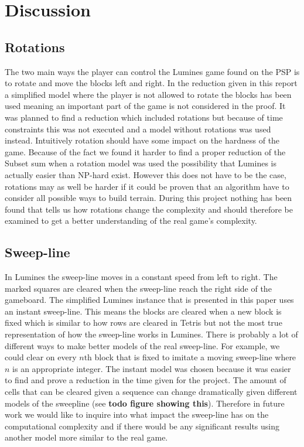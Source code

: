 \section{Discussion}
\label{discussion}

\subsection{Rotations}

The two main ways the player can control the Lumines game found on the PSP is to rotate and move the blocks left and right. In the reduction given in this report a simplified model where the player is not allowed to rotate the blocks has been used meaning an important part of the game is not considered in the proof. It was planned to find a reduction which included rotations but because of time constraints this was not executed and a model without rotations was used instead. Intuitively rotation should have some impact on the hardness of the game. Because of the fact we found it harder to find a proper reduction of the Subset sum when a rotation model was used the possibility that Lumines is actually easier than NP-hard exist. However this does not have to be the case, rotations may as well be harder if it could be proven that an algorithm have to consider all possible ways to build terrain. During this project nothing has been found that tells us how rotations change the complexity and should therefore be examined to get a better understanding of the real game's complexity.

\subsection{Sweep-line}

In Lumines the sweep-line moves in a constant speed from left to right. The marked squares are cleared when the sweep-line reach the right side of the gameboard. The simplified Lumines instance that is presented in this paper uses an instant sweep-line. This means the blocks are cleared when a new block is fixed which is similar to how rows are cleared in Tetris but not the most true representation of how the sweep-line works in Lumines. There is probably a lot of different ways to make better models of the real sweep-line. For example, we could clear on every $n\text{th}$ block that is fixed to imitate a moving sweep-line where $n$ is an appropriate integer. The instant model was chosen because it was easier to find and prove a reduction in the time given for the project. The amount of cells that can be cleared given a sequence can change dramatically given different models of the sweepline (see \textbf{todo figure showing this}). Therefore in future work we would like to inquire into what impact the sweep-line has on the computational complexity and if there would be any significant results using another model more similar to the real game.

